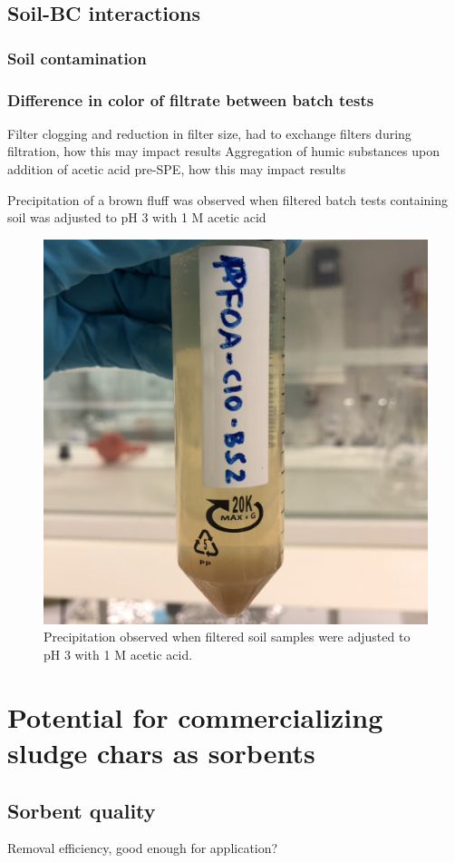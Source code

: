 \subsection{Soil-BC interactions}

\subsubsection{Soil contamination}

\subsubsection{Difference in color of filtrate between batch tests}
Filter clogging and reduction in filter size, had to exchange filters during filtration, how this may impact results
Aggregation of humic substances upon addition of acetic acid pre-SPE, how this may impact results

Precipitation of a brown fluff was observed when filtered batch tests containing soil was adjusted to pH 3 with 1 M acetic acid

\begin{figure}
    \centering
    \includegraphics[width=0.6\linewidth,scale=0.6]{Bilder/Samples/Precipitation.jpg}
    \caption{Precipitation observed when filtered soil samples were adjusted to pH 3 with 1 M acetic acid.}
    \label{fig:precip}
\end{figure}

\section{Potential for commercializing sludge chars as sorbents}
\subsection{Sorbent quality}
Removal efficiency, good enough for application?
